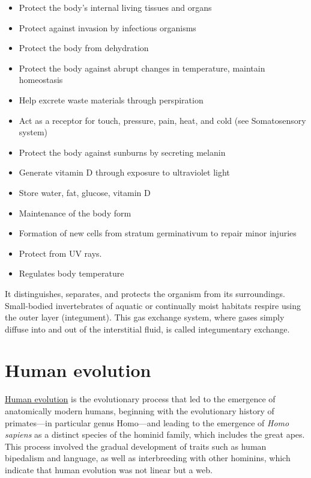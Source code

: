 \begin{itemize}
\tightlist
\item
  Protect the body's internal living tissues and organs
\item
  Protect against invasion by infectious organisms
\item
  Protect the body from dehydration
\item
  Protect the body against abrupt changes in temperature, maintain homeostasis
\item
  Help excrete waste materials through perspiration
\item
  Act as a receptor for touch, pressure, pain, heat, and cold (see Somatosensory system)
\item
  Protect the body against sunburns by secreting melanin
\item
  Generate vitamin D through exposure to ultraviolet light
\item
  Store water, fat, glucose, vitamin D
\item
  Maintenance of the body form
\item
  Formation of new cells from stratum germinativum to repair minor injuries
\item
  Protect from UV rays.
\item
  Regulates body temperature
\end{itemize}

It distinguishes, separates, and protects the organism from its surroundings. Small-bodied invertebrates of aquatic or continually moist habitats respire using the outer layer (integument). This gas exchange system, where gases simply diffuse into and out of the interstitial fluid, is called integumentary exchange.

\hypertarget{human-evolution}{%
\section{Human evolution}\label{human-evolution}}

\href{https://en.wikipedia.org/wiki/Human_evolution}{Human evolution} is the evolutionary process that led to the emergence of anatomically modern humans, beginning with the evolutionary history of primates---in particular genus Homo---and leading to the emergence of \emph{Homo sapiens} as a distinct species of the hominid family, which includes the great apes. This process involved the gradual development of traits such as human bipedalism and language, as well as interbreeding with other hominins, which indicate that human evolution was not linear but a web.



